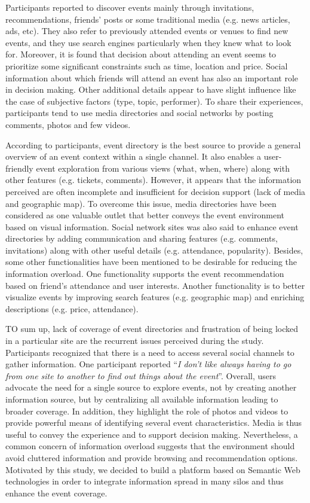  Participants reported to discover events mainly through invitations, recommendations, friends' posts or some traditional media (e.g. news articles, ads, etc). They also refer to previously attended events or venues to find new events, and they use search engines particularly when they knew what to look for. Moreover, it is found that decision about attending an event seems to prioritize some significant constraints such as time, location and price. Social information about which friends will attend an event has also an important role in decision making. Other additional details appear to have slight influence like the case of subjective factors (type, topic, performer). To share their experiences, participants tend to use media directories and social networks by posting comments, photos and few videos. 

 According to participants, event directory is the best source to provide a general overview of an event context within a single channel. It also enables a user-friendly event exploration from various views (what, when, where) along with other features (e.g. tickets, comments). However, it appears that the information perceived are often incomplete and insufficient for decision support (lack of media and geographic map). To overcome this issue, media directories have been considered as one valuable outlet that better conveys the event environment based on visual information. Social network sites was also said to enhance event directories by adding communication and sharing features (e.g. comments, invitations) along with other useful details (e.g. attendance, popularity). Besides, some other functionalities have been mentioned to be desirable for reducing the information overload. One functionality supports the event recommendation based on friend's attendance and user interests. Another functionality is to better visualize events by improving search features (e.g. geographic map) and enriching descriptions (e.g. price, attendance).

 TO sum up, lack of coverage of event directories and frustration of being locked in a particular site are the recurrent issues perceived during the study. Participants recognized that there is a need to access several social channels to gather information. One participant reported ``\textit{I don't like always having to go from one site to another to find out things about the event}''. Overall, users advocate the need for a single source to explore events, not by creating another information source, but by centralizing all available information leading to broader coverage. In addition, they highlight the role of photos and videos to provide powerful means of identifying several event characteristics. Media is thus useful to convey the experience and to support decision making. Nevertheless, a common concern of information overload suggests that the environment should avoid cluttered information and provide browsing and recommendation options. Motivated by this study, we decided to build a platform based on Semantic Web technologies in order to integrate information spread in many silos and thus enhance the event coverage.

